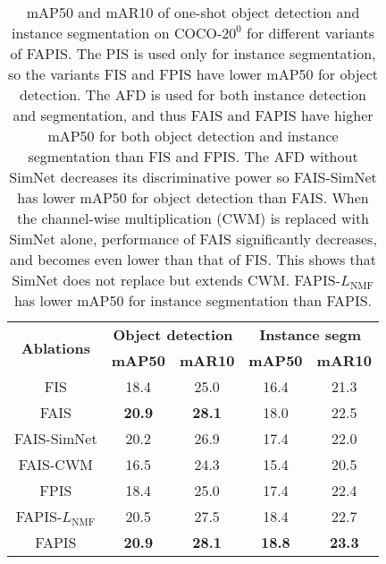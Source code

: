 \documentclass[final]{cvpr}
\begin{document}
\begin{table}[]
\begin{center}
\small
\begin{tabular}{c|c|c|c|c}
\hline
\hline
\multirow{2}{*}{\textbf{Ablations}} & \multicolumn{2}{c|}{\textbf{Object detection}} & \multicolumn{2}{c}{\textbf{Instance segm}} \\ \cline{2-5} 
 & \textbf{mAP50} & \textbf{mAR10} & \textbf{mAP50} & \textbf{mAR10}   \\ \hline
FIS         & 18.4 & 25.0 & 16.4 & 21.3 \\
FAIS        & \textbf{20.9} & \textbf{28.1} & 18.0 & 22.5  \\
FAIS-SimNet & 20.2 & 26.9 & 17.4 & 22.0 \\
FAIS-CWM    & 16.5 & 24.3 & 15.4 & 20.5 \\
FPIS        & 18.4 & 25.0 & 17.4 & 22.4 \\
FAPIS-$L_{\text{NMF}}$& 20.5 & 27.5 & 18.4 & 22.7 \\
FAPIS       & \textbf{20.9} & \textbf{28.1} & \textbf{18.8} & \textbf{23.3}  \\
\hline 
\hline
\end{tabular}
\end{center}
\caption{mAP50 and mAR10 of one-shot object detection and instance segmentation on COCO-$20^0$ for different variants of FAPIS. The  PIS  is used only for instance segmentation, so the variants FIS and FPIS have lower mAP50 for object detection. The AFD is used for both instance detection and segmentation, and thus FAIS and FAPIS have higher mAP50 for both object detection and instance segmentation than FIS and FPIS.
The AFD without SimNet decreases its discriminative power so FAIS-SimNet has lower mAP50 for object detection than FAIS.
When the channel-wise multiplication (CWM) is replaced with SimNet alone, performance of FAIS significantly decreases, and becomes even lower than that of FIS. This shows that SimNet does not replace but extends CWM.
FAPIS-$L_{\text{NMF}}$ has lower mAP50 for instance segmentation than FAPIS. 
}
\label{tab:variants}
\end{table}
\end{document}
